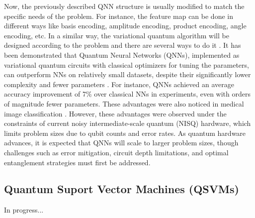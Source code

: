 \documentclass{article}
\begin{document}
Now, the previously described QNN structure is usually modified to match the specific needs of the problem. 
For instance, the feature map can be done in different ways like basis encoding, amplitude encoding, product encoding, angle encoding, etc. 
In a similar way, the variational quantum algorithm will be designed according to the problem and there are several ways to do it \cite{9528698}.
It has been demonstrated that Quantum Neural Networks (QNNs), implemented as variational quantum circuits with classical optimizers
for tuning the parameters, can outperform NNs on relatively small datasets, despite their significantly 
lower complexity and fewer parameters \cite{10015720}. For instance, QNNs achieved an average accuracy improvement of 7\% over 
classical NNs in experiments, even with orders of magnitude fewer parameters.
These advantages were also noticed in medical image classification \cite{10613907, 9293291}. 
However, these advantages were observed under the constraints of current noisy intermediate-scale quantum (NISQ) hardware, which limits problem
sizes due to qubit counts and error rates. As quantum hardware advances, it is expected that QNNs will scale to larger problem sizes, though 
challenges such as error mitigation, circuit depth limitations, and optimal entanglement strategies must first be addressed.


\subsection*{Quantum Suport Vector Machines (QSVMs)}
In progress...
\end{document}
